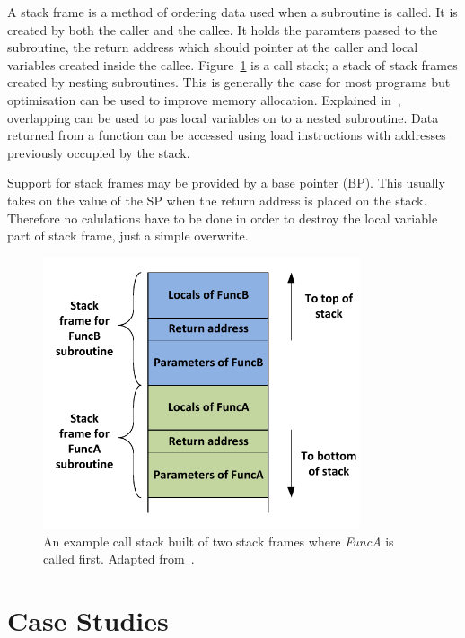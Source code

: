 \documentclass[12pt,a4paper]{article}
\begin{document}
A stack frame is a method of ordering data used when a subroutine is called.
It is created by both the caller and the callee.
It holds the paramters passed to the subroutine, the return address which should pointer at the caller and local variables created inside the callee.
Figure~\ref{fig:call} is a call stack; a stack of stack frames created by nesting subroutines.
This is generally the case for most programs but optimisation can be used to improve memory allocation.
Explained in~\cite{callWiki}, overlapping can be used to pas local variables on to a nested subroutine.
Data returned from a function can be accessed using load instructions with addresses previously occupied by the stack.

Support for stack frames may be provided by a base pointer (BP).
This usually takes on the value of the SP when the return address is placed on the stack.
Therefore no calulations have to be done in order to destroy the local variable part of stack frame, just a simple overwrite.

\begin{figure}[htb]
   \centering
   \includegraphics[height=8cm]{Figures/CallStack.pdf}
   \caption{An example call stack built of two stack frames where \emph{FuncA} is called first. Adapted from~\cite{callWiki}.}
   \label{fig:call}
\end{figure}






\section{Case Studies}
\end{document}
